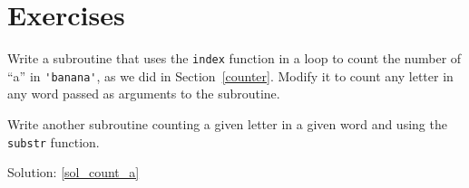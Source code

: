 \section{Exercises}


\begin{exercise}
\label{count_a}

Write a subroutine that uses the {\tt index} function in a 
loop to count the number of ``a'' in \verb"'banana'",
as we did in Section~\ref{counter}. Modify it to count 
any letter in any word passed as arguments to the subroutine.

Write another subroutine counting a given letter in a given 
word and using the {\tt substr} function.

Solution: \ref{sol_count_a}
\end{exercise}


